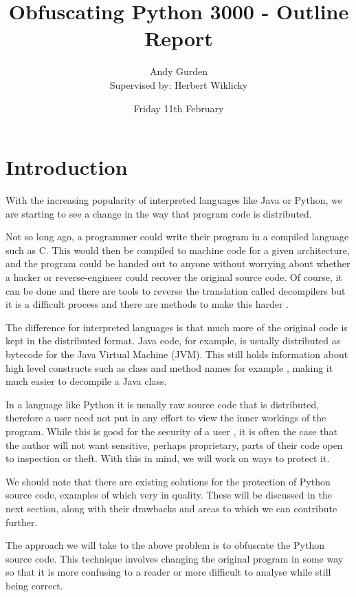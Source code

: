 \documentclass{report}
\title{Obfuscating Python 3000 - Outline Report}
\author{Andy Gurden\\Supervised by: Herbert Wiklicky}
\date{Friday 11th February}
\begin{document}
\maketitle

\section{Introduction}

With the increasing popularity of interpreted languages like Java or Python, we are starting
to see a change in the way that program code is distributed.

Not so long ago, a programmer could write their program in a compiled language such as C. This would then be compiled
to machine code for a given architecture, and the program could be handed out to anyone without
worrying about whether a hacker or reverse-engineer could recover the original source code.
Of course, it can be done and there are tools to reverse the translation called decompilers\cite{cdecomp} but it
is a difficult process and there are methods to make this harder \cite{disres}.

The difference for interpreted languages is that much more of the original code is kept in the
distributed format. Java code, for example, is usually distributed as bytecode for the Java Virtual
Machine (JVM). This still holds information about high level constructs such as class and method names for example \cite{classinfo},
making it much easier to decompile a Java class.

In a language like Python it is usually raw source code that is distributed, therefore a
user need not put in any effort to view the inner workings of the program. While this is good
for the security of a user \cite{noobf}, it is often the case that the author will not want sensitive,
perhaps proprietary, parts of their code open to inspection or theft. With this in mind, we will work on ways to protect it.

We should note that there are existing solutions for the protection of Python source code, examples of which very in quality.
These will be discussed in the next section, along with their drawbacks and areas to which we can contribute further.

The approach we will take to the above problem is to obfuscate the Python source code. This technique involves changing the
original program in some way so that it is more confusing to a reader or more difficult to analyse while still being correct.
\end{document}
